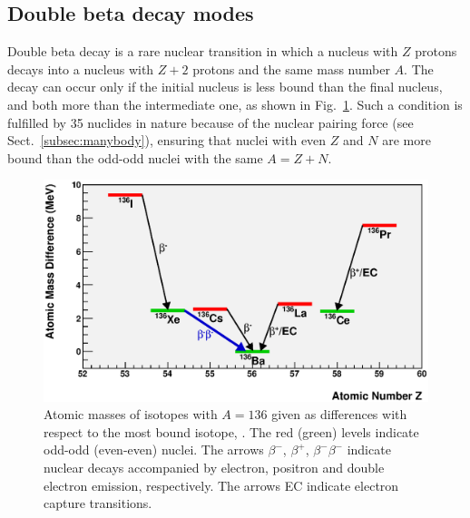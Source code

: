 \subsection{Double beta decay modes} \label{subsec:bbmodes}
%
Double beta decay is a rare nuclear transition in which a nucleus with $Z$ protons decays into a nucleus with $Z+2$ protons and the same mass number $A$. The decay can occur only if the initial nucleus is less bound than the final nucleus, and both more than the intermediate one, as shown in Fig.~\ref{fig:atomicmasses_a136}. Such a condition is fulfilled by 35 nuclides in nature because of the nuclear pairing force (see Sect.~\ref{subsec:manybody}), ensuring that nuclei with even $Z$ and $N$ are more bound than the odd-odd nuclei with the same $A=Z+N$.

\begin{figure}[tb]
\centering
\includegraphics[width=\textwidth]{img/atomicmasses_a136.eps}
\caption{Atomic masses of isotopes with $A=136$ given as differences with respect to the most bound isotope, . The red (green) levels indicate odd-odd (even-even) nuclei. The arrows $\beta^-$, $\beta^+$, $\beta^-\beta^-$ indicate nuclear decays accompanied by electron, positron and double electron emission, respectively. The arrows EC indicate electron capture transitions.} \label{fig:atomicmasses_a136}
\end{figure}

